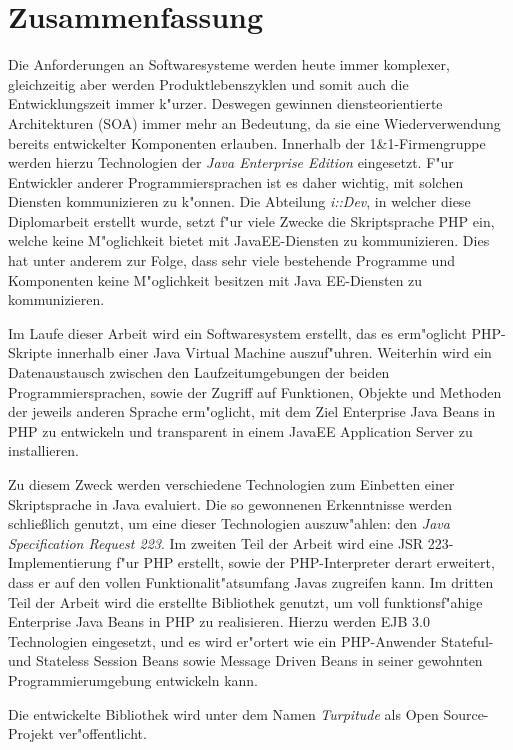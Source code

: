 \chapter{Zusammenfassung}

Die Anforderungen an Softwaresysteme werden heute immer komplexer, gleichzeitig aber
werden Produktlebenszyklen und somit auch die Entwicklungszeit immer k"urzer. Deswegen
gewinnen diensteorientierte Architekturen (SOA) immer mehr an Bedeutung, da sie eine
Wiederverwendung bereits entwickelter Komponenten erlauben. Innerhalb der 1\&1-Firmengruppe
werden hierzu Technologien der \emph{Java Enterprise Edition} eingesetzt. F"ur Entwickler
anderer Programmiersprachen ist es daher wichtig, mit solchen Diensten kommunizieren
zu k"onnen. Die Abteilung \emph{i::Dev}, in welcher diese Diplomarbeit erstellt wurde,
setzt f"ur viele Zwecke die Skriptsprache PHP ein, welche keine M"oglichkeit bietet
mit JavaEE-Diensten zu kommunizieren. Dies hat unter anderem zur Folge, dass
sehr viele bestehende Programme und Komponenten keine M"oglichkeit besitzen mit Java EE-Diensten
zu kommunizieren.

Im Laufe dieser Arbeit wird ein Softwaresystem erstellt, das es erm"oglicht
PHP-Skripte innerhalb einer Java Virtual Machine auszuf"uhren. Weiterhin
wird ein Datenaustausch zwischen den Laufzeitumgebungen der beiden 
Programmiersprachen, sowie der Zugriff auf Funktionen, Objekte und Methoden
der jeweils anderen Sprache erm"oglicht, mit dem Ziel Enterprise Java Beans in
PHP zu entwickeln und transparent in einem JavaEE Application Server zu installieren.

Zu diesem Zweck werden verschiedene Technologien zum Einbetten einer Skriptsprache
in Java evaluiert. Die so gewonnenen Erkenntnisse werden schlie\ss lich 
genutzt, um eine dieser Technologien auszuw"ahlen: den \emph{Java Specification Request 223}.
Im zweiten Teil der Arbeit wird eine JSR 223-Implementierung f"ur PHP erstellt, sowie
der PHP-Interpreter derart erweitert, dass er auf den vollen Funktionalit"atsumfang
Javas zugreifen kann. Im dritten Teil der Arbeit wird die erstellte Bibliothek genutzt,
um voll funktionsf"ahige Enterprise Java Beans in PHP zu realisieren. 
Hierzu werden EJB 3.0 Technologien eingesetzt,
und es wird er"ortert wie ein PHP-Anwender Stateful- und Stateless Session Beans sowie 
Message Driven Beans in seiner gewohnten Programmierumgebung entwickeln kann.

Die entwickelte Bibliothek wird unter dem Namen \emph{Turpitude} als Open Source-Projekt
ver"offentlicht.
